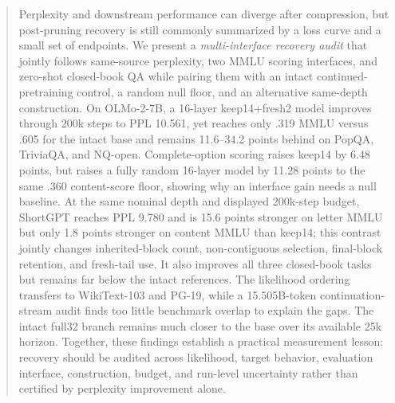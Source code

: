 \begin{abstract}
Perplexity and downstream performance can diverge after compression, but
post-pruning recovery is still commonly summarized by a loss curve and a small
set of endpoints. We present a \emph{multi-interface recovery audit} that
jointly follows same-source perplexity, two MMLU scoring
interfaces, and zero-shot closed-book QA while pairing them with an intact
continued-pretraining control, a random null floor, and an alternative
same-depth construction. On OLMo-2-7B, a 16-layer keep14+fresh2 model improves
through 200k steps to PPL 10.561, yet reaches only .319 MMLU versus .605 for the
intact base and remains 11.6--34.2 points behind on PopQA, TriviaQA, and
NQ-open. Complete-option scoring raises keep14 by 6.48 points, but raises a
fully random 16-layer model by 11.28 points to the same .360 content-score
floor, showing why an interface gain needs a null baseline. At the same nominal
depth and displayed 200k-step budget, ShortGPT reaches PPL 9.780 and is
15.6 points stronger on letter MMLU but only 1.8 points stronger on content
MMLU than keep14; this contrast jointly changes inherited-block count,
non-contiguous selection, final-block retention, and fresh-tail use. It also
improves all three closed-book tasks but remains far below the intact
references. The likelihood ordering transfers to WikiText-103 and PG-19, while
a 15.505B-token continuation-stream audit finds too little benchmark overlap
to explain the gaps. The intact full32 branch remains much
closer to the base over its available 25k horizon. Together, these findings
establish a practical measurement lesson: recovery should be audited across
likelihood, target behavior, evaluation interface, construction, budget, and
run-level uncertainty rather than certified by perplexity improvement alone.
\end{abstract}
